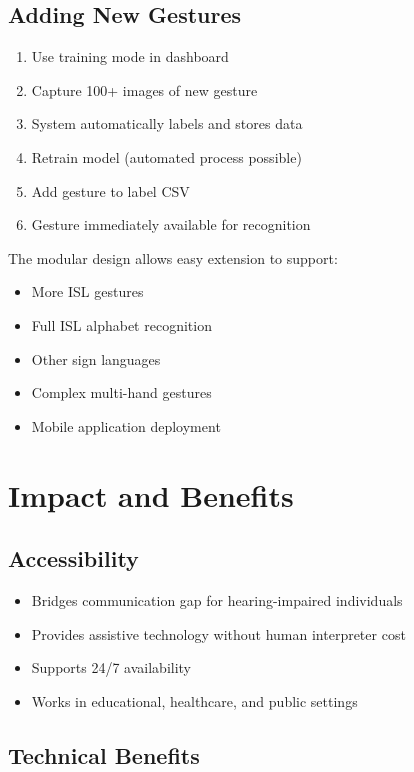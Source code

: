 \subsection{Adding New Gestures}

\begin{enumerate}
    \item Use training mode in dashboard
    \item Capture 100+ images of new gesture
    \item System automatically labels and stores data
    \item Retrain model (automated process possible)
    \item Add gesture to label CSV
    \item Gesture immediately available for recognition
\end{enumerate}

The modular design allows easy extension to support:
\begin{itemize}
    \item More ISL gestures
    \item Full ISL alphabet recognition
    \item Other sign languages
    \item Complex multi-hand gestures
    \item Mobile application deployment
\end{itemize}

\section{Impact and Benefits}

\subsection{Accessibility}

\begin{itemize}
    \item Bridges communication gap for hearing-impaired individuals
    \item Provides assistive technology without human interpreter cost
    \item Supports 24/7 availability
    \item Works in educational, healthcare, and public settings
\end{itemize}

\subsection{Technical Benefits}

